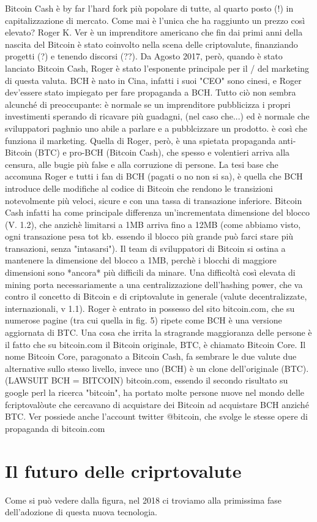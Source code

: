 \documentclass {article}
\begin{document}
Bitcoin Cash è by far l'hard fork più popolare di tutte, al quarto posto (!) in capitalizzazione di mercato. Come mai è l'unica che ha raggiunto un prezzo così elevato?
Roger K. Ver è un imprenditore americano che fin dai primi anni della nascita del Bitcoin è stato coinvolto nella scena delle criptovalute, finanziando progetti (?) e tenendo discorsi (??).
Da Agosto 2017, però, quando è stato lanciato Bitcoin Cash, Roger è stato l'esponente principale per il / del marketing di questa valuta. BCH è nato in Cina, infatti i suoi "CEO" sono cinesi, e Roger dev'essere stato impiegato per fare propaganda a BCH.
Tutto ciò non sembra alcunché di preoccupante: è normale se un imprenditore pubblicizza i propri investimenti sperando di ricavare più guadagni, (nel caso che...) ed è normale che sviluppatori paghnio uno abile a parlare e a pubblcizzare un prodotto.
è così che funziona il marketing.
Quella di Roger, però, è una spietata propaganda anti-Bitcoin (BTC) e pro-BCH (Bitcoin Cash), che spesso e volentieri arriva alla censura, alle bugie più false e alla corruzione di persone.
La tesi base che accomuna Roger e tutti i fan di BCH (pagati o no non si sa), è quella che BCH introduce delle modifiche al codice di Bitcoin che rendono le transizioni notevolmente più veloci, sicure e con una tassa di transazione inferiore. Bitcoin Cash infatti ha come principale differenza un'incrementata dimensione del blocco (V. 1.2), che anzichè limitarsi a 1MB arriva fino a 12MB (come abbiamo visto, ogni transazione pesa tot kb. essendo il blocco più grande può farci stare più transazioni, senza "intasarsi").
Il team di sviluppatori di Bitcoin si ostina a mantenere la dimensione del blocco a 1MB, perchè i blocchi di maggiore dimensioni sono *ancora* più difficili da minare.
Una difficoltà così elevata di mining porta necessariamente a una centralizzazione dell'hashing power, che va contro il concetto di Bitcoin e di criptovalute in generale (valute decentralizzate, internazionali, v 1.1).
Roger è entrato in possesso del sito bitcoin.com, che su numerose pagine (tra cui quella in fig. 5) ripete come BCH è una versione aggiornata di BTC. Una cosa che irrita la stragrande maggioranza delle persone è il fatto che su bitcoin.com il Bitcoin originale, BTC, è chiamato Bitcoin Core.
Il nome Bitcoin Core, paragonato a Bitcoin Cash, fa sembrare le due valute due alternative sullo stesso livello, invece uno (BCH) è un clone dell'originale (BTC). (LAWSUIT BCH = BITCOIN)
bitcoin.com, essendo il secondo risultato su google perl la ricerca "bitcoin", ha portato molte persone nuove nel mondo delle fcriptovalòute che cercavano di acquistare dei Bitcoin ad acquistare BCH anziché BTC.
Ver possiede anche l'account twitter @bitcoin, che svolge le stesse opere di propaganda di bitcoin.com


\section {Il futuro delle criprtovalute}


Come si può vedere dalla figura, nel 2018 ci troviamo alla primissima fase dell'adozione di questa nuova tecnologia.
\end{document}
